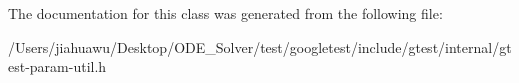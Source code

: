 The documentation for this class was generated from the following file\+:\begin{DoxyCompactItemize}
\item 
/\+Users/jiahuawu/\+Desktop/\+O\+D\+E\+\_\+\+Solver/test/googletest/include/gtest/internal/gtest-\/param-\/util.\+h\end{DoxyCompactItemize}
